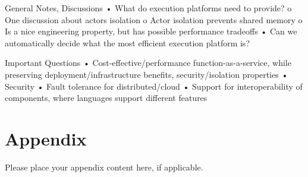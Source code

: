 \begin{bibunit}
\begin{noteco}
  General Notes, Discussions
  •	What do execution platforms need to provide?
     o	One discussion about actors isolation
     o	Actor isolation prevents shared memory
     o	Is a nice engineering property, but has possible performance tradeoffs 
  •	Can we automatically decide what the most efficient execution platform is?


  Important Questions
  •	Cost-effective/performance function-as-a-service, while preserving deployment/infrastructure benefits, security/isolation properties
  •	Security
  •	Fault tolerance for distributed/cloud 
  •	Support for interoperability of components, where languages support different features
\end{noteco}  
  
	\section*{Appendix}\label{appendix}
	
	Please place your appendix content here, if applicable.
	
	
	
	
	
\end{bibunit}
	
%